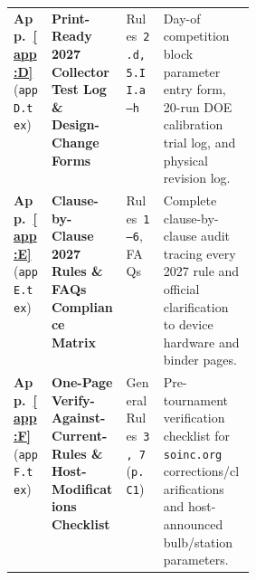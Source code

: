 \documentclass[10pt,twoside,openany,letterpaper]{book}
\begin{document}
\begin{center}
\begin{tabularx}{\linewidth}{@{}l>{\raggedright\arraybackslash}p{0.31\linewidth}l>{\raggedright\arraybackslash}X@{}}
\rowcolor{rowalt}\textbf{App.~\ref{app:D}} (\texttt{appD.tex}) & \textbf{Print-Ready 2027 Collector Test Log \& Design-Change Forms} & Rules~\texttt{2.d, 5.II.a--h} & Day-of competition block parameter entry form, 20-run DOE calibration trial log, and physical revision log. \\
\textbf{App.~\ref{app:E}} (\texttt{appE.tex}) & \textbf{Clause-by-Clause 2027 Rules \& FAQs Compliance Matrix} & Rules~\texttt{1--6}, FAQs & Complete clause-by-clause audit tracing every 2027 rule and official clarification to device hardware and binder pages. \\
\rowcolor{rowalt}\textbf{App.~\ref{app:F}} (\texttt{appF.tex}) & \textbf{One-Page Verify-Against-Current-Rules \& Host-Modifications Checklist} & General Rules~\texttt{3, 7} (\texttt{p.\ C1}) & Pre-tournament verification checklist for \texttt{soinc.org} corrections/clarifications and host-announced bulb/station parameters. \\
\bottomrule
\end{tabularx}
\end{center}
\end{document}
